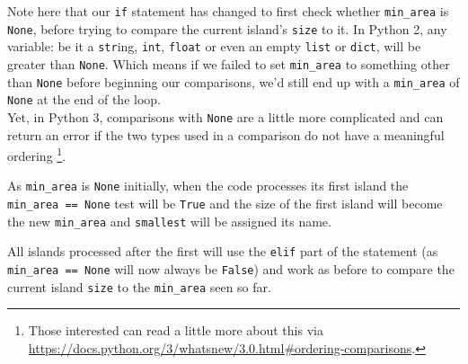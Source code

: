 \documentclass[a4paper]{article}
\begin{document}
Note here that our \texttt{if} statement has changed to first check whether \texttt{min\_area}
is \texttt{None}, before trying to compare the current island's \texttt{size} to it.
In Python 2, any variable: be it a \texttt{str}ing, \texttt{int}, \texttt{float} or even
an empty \texttt{list} or \texttt{dict}, will be greater than \texttt{None}. Which means
if we failed to set \texttt{min\_area} to something other than \texttt{None} before beginning
our comparisons, we'd still end up with a \texttt{min\_area} of \texttt{None} at the end of the loop.
\\Yet, in Python 3, comparisons with \texttt{None} are a little more complicated and can
return an error if the two types used in a comparison do not have a meaningful ordering
\footnote{Those interested can read a little more about this via {\href{https://docs.python.org/3/whatsnew/3.0.html\#ordering-comparisons}{https://docs.python.org/3/whatsnew/3.0.html\#ordering-comparisons}}.}.

As \texttt{min\_area} is \texttt{None} initially, when the code processes its first island
the \texttt{min\_area == None} test will be \texttt{True} and the size of the first island
will become the new \texttt{min\_area} and \texttt{smallest} will be assigned its name.

All islands processed after the first will use the \texttt{elif} part of the statement
(as \texttt{min\_area == None} will now always be \texttt{False}) and work as before
to compare the current island \texttt{size} to the \texttt{min\_area} seen so far.
\end{document}
